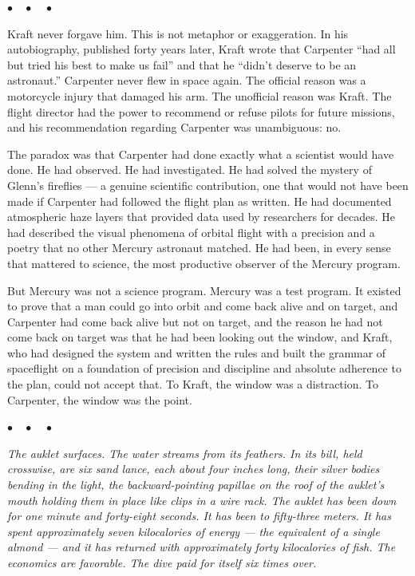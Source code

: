 \documentclass[12pt, letterpaper]{article}
\begin{document}
\begin{center}
$\bullet\quad\bullet\quad\bullet$
\end{center}

Kraft never forgave him. This is not metaphor or exaggeration. In his autobiography, published forty years later, Kraft wrote that Carpenter ``had all but tried his best to make us fail'' and that he ``didn't deserve to be an astronaut.'' Carpenter never flew in space again. The official reason was a motorcycle injury that damaged his arm. The unofficial reason was Kraft. The flight director had the power to recommend or refuse pilots for future missions, and his recommendation regarding Carpenter was unambiguous: no.

The paradox was that Carpenter had done exactly what a scientist would have done. He had observed. He had investigated. He had solved the mystery of Glenn's fireflies --- a genuine scientific contribution, one that would not have been made if Carpenter had followed the flight plan as written. He had documented atmospheric haze layers that provided data used by researchers for decades. He had described the visual phenomena of orbital flight with a precision and a poetry that no other Mercury astronaut matched. He had been, in every sense that mattered to science, the most productive observer of the Mercury program.

But Mercury was not a science program. Mercury was a test program. It existed to prove that a man could go into orbit and come back alive and on target, and Carpenter had come back alive but not on target, and the reason he had not come back on target was that he had been looking out the window, and Kraft, who had designed the system and written the rules and built the grammar of spaceflight on a foundation of precision and discipline and absolute adherence to the plan, could not accept that. To Kraft, the window was a distraction. To Carpenter, the window was the point.

\begin{center}
$\bullet\quad\bullet\quad\bullet$
\end{center}

\emph{The auklet surfaces. The water streams from its feathers. In its bill, held crosswise, are six sand lance, each about four inches long, their silver bodies bending in the light, the backward-pointing papillae on the roof of the auklet's mouth holding them in place like clips in a wire rack. The auklet has been down for one minute and forty-eight seconds. It has been to fifty-three meters. It has spent approximately seven kilocalories of energy --- the equivalent of a single almond --- and it has returned with approximately forty kilocalories of fish. The economics are favorable. The dive paid for itself six times over.}
\end{document}
